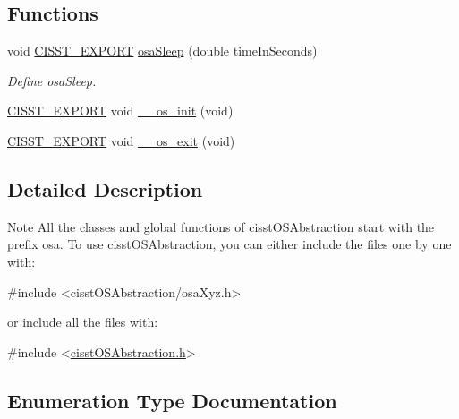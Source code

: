 \subsection*{Functions}
\begin{DoxyCompactItemize}
\item 
void \hyperlink{cmn_export_macros_8h_a99393e0c3ac434b2605235bbe20684f8}{C\+I\+S\+S\+T\+\_\+\+E\+X\+P\+O\+R\+T} \hyperlink{group__cisst_o_s_abstraction_ga54ab2658f0c75b6004c12c11d96f2e00}{osa\+Sleep} (double time\+In\+Seconds)
\begin{DoxyCompactList}\small\item\em Define osa\+Sleep. \end{DoxyCompactList}\item 
\hyperlink{cmn_export_macros_8h_a99393e0c3ac434b2605235bbe20684f8}{C\+I\+S\+S\+T\+\_\+\+E\+X\+P\+O\+R\+T} void \hyperlink{group__cisst_o_s_abstraction_gae5841775264a0bce1dc3e04ed9049f62}{\+\_\+\+\_\+os\+\_\+init} (void)
\item 
\hyperlink{cmn_export_macros_8h_a99393e0c3ac434b2605235bbe20684f8}{C\+I\+S\+S\+T\+\_\+\+E\+X\+P\+O\+R\+T} void \hyperlink{group__cisst_o_s_abstraction_gacc130f6821ff63dd4281f663837649e9}{\+\_\+\+\_\+os\+\_\+exit} (void)
\end{DoxyCompactItemize}


\subsection{Detailed Description}
\begin{DoxyNote}{Note}
All the classes and global functions of cisst\+O\+S\+Abstraction start with the prefix osa. To use cisst\+O\+S\+Abstraction, you can either include the files one by one with\+: 
\begin{DoxyCode}
\textcolor{preprocessor}{#include <cisstOSAbstraction/osaXyz.h>}
\end{DoxyCode}
 or include all the files with\+: 
\begin{DoxyCode}
\textcolor{preprocessor}{#include <\hyperlink{cisst_o_s_abstraction_8h}{cisstOSAbstraction.h}>}
\end{DoxyCode}
 
\end{DoxyNote}


\subsection{Enumeration Type Documentation}
\hypertarget{group__cisst_o_s_abstraction_ga3fd8e997892088f924754f9cc11c78a4}{}
